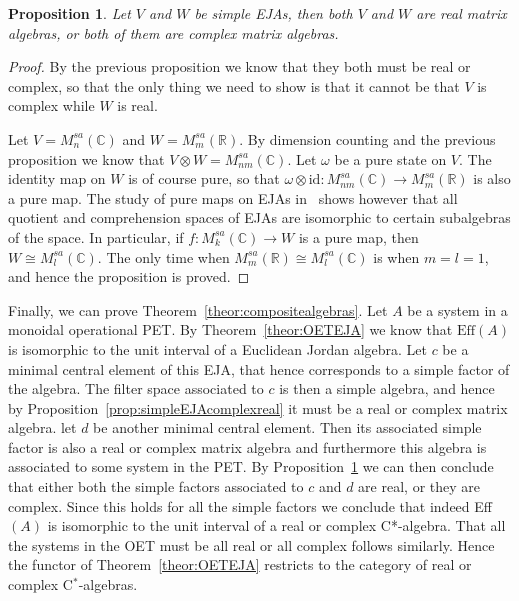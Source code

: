 \documentclass[b5paper,onecolumn,12pt,accepted=2019-05-03, issue=1, volume=1, shorttitle=papers/compositionality-1-1]{compositionalityarticle}
\newcounter{counter}
\numberwithin{counter}{section}
\newtheorem{proposition}[counter]{Proposition}
\newcommand{\R}{\mathbb{R}}
\newcommand{\C}{\mathbb{C}}
\newcommand{\pred}{\text{Eff}}
\newcommand{\id}{\text{id}}
\begin{document}
\begin{proposition}\label{prop:complexrealexclusion}
    Let $V$ and $W$ be simple EJAs, then both $V$ and $W$ are real matrix algebras, or both of them are complex matrix algebras.
\end{proposition}
\begin{proof}
    By the previous proposition we know that they both must be real or complex, so that the only thing we need to show is that it cannot be that $V$ is complex while $W$ is real.

    Let $V=M_n^{sa}(\C)$ and $W=M_m^{sa}(\R)$. By dimension counting and the previous proposition we know that $V\otimes W = M_{nm}^{sa}(\C)$. Let $\omega$ be a pure state on $V$. The identity map on $W$ is of course pure, so that $\omega\otimes \id: M_{nm}^{sa}(\C) \rightarrow M_m^{sa}(\R)$ is also a pure map. The study of pure maps on EJAs in~\cite{westerbaan2018puremaps} shows however that all quotient and comprehension spaces of EJAs are isomorphic to certain subalgebras of the space. In particular, if $f: M_k^{sa}(\C)\rightarrow W$ is a pure map, then $W\cong M_l^{sa}(\C)$. The only time when $M_m^{sa}(\R) \cong M_l^{sa}(\C)$ is when $m=l=1$, and hence the proposition is proved.
\end{proof}

Finally, we can prove Theorem~\ref{theor:compositealgebras}.
Let $A$ be a system in a monoidal operational PET. By Theorem~\ref{theor:OETEJA} we know that $\pred(A)$ is isomorphic to the unit interval of a Euclidean Jordan algebra. Let $c$ be a minimal central element of this EJA, that hence corresponds to a simple factor of the algebra. The filter space associated to $c$ is then a simple algebra, and hence by Proposition~\ref{prop:simpleEJAcomplexreal} it must be a real or complex matrix algebra. let $d$ be another minimal central element. Then its associated simple factor is also a real or complex matrix algebra and furthermore this algebra is associated to some system in the PET. By Proposition~\ref{prop:complexrealexclusion} we can then conclude that either both the simple factors associated to $c$ and $d$ are real, or they are complex. Since this holds for all the simple factors we conclude that indeed Eff$(A)$ is isomorphic to the unit interval of a real or complex C*-algebra. That all the systems in the OET must be all real or all complex follows similarly.
Hence the functor of Theorem~\ref{theor:OETEJA} restricts to the category of real or complex C$^*$-algebras.
\end{document}
